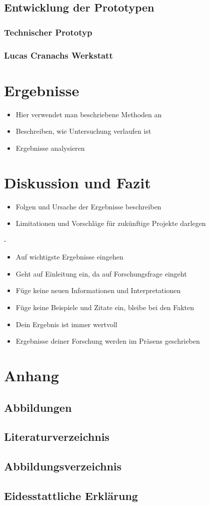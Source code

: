 \documentclass[a4paper,12pt,oneside]{article}
\begin{document}
    \subsection{Entwicklung der Prototypen}
      \subsubsection{Technischer Prototyp}
      \subsubsection{Lucas Cranachs Werkstatt}
  \section{Ergebnisse}
    \begin{itemize}
      \item Hier verwendet man beschriebene Methoden an
      \item Beschreiben, wie Untersuchung verlaufen ist
      \item Ergebnisse analysieren
    \end{itemize}
  \section{Diskussion und Fazit}
    \begin{itemize}
      \item Folgen und Ursache der Ergebnisse beschreiben
      \item Limitationen und Vorschläge für zukünftige Projekte darlegen
    \end{itemize}
    -
    \begin{itemize}
      \item Auf wichtigste Ergebnisse eingehen
      \item Geht auf Einleitung ein, da auf Forschungsfrage eingeht
      \item Füge keine neuen Informationen und Interpretationen
      \item Füge keine Beispiele und Zitate ein, bleibe bei den Fakten
      \item Dein Ergebnis ist immer wertvoll
      \item Ergebnisse deiner Forschung werden im Präsens geschrieben
    \end{itemize}
  \section{Anhang}
    \subsection{Abbildungen}
    \subsection{Literaturverzeichnis}
      \printbibliography
    \subsection{Abbildungsverzeichnis}
    \subsection{Eidesstattliche Erklärung} 
\end{document}
